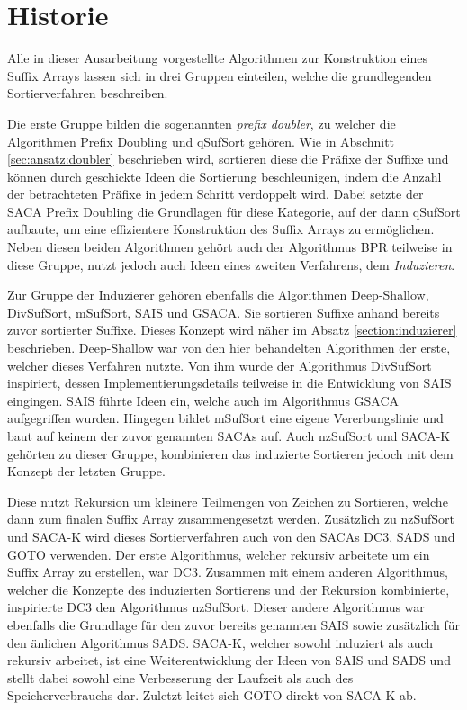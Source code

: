 \section{Historie}
Alle  in dieser Ausarbeitung vorgestellte Algorithmen zur Konstruktion eines Suffix Arrays lassen sich in drei Gruppen einteilen, welche die grundlegenden Sortierverfahren beschreiben. \par
Die erste Gruppe bilden die sogenannten \textit{prefix doubler}, zu welcher die Algorithmen Prefix Doubling und qSufSort geh{\"o}ren.
Wie in Abschnitt \ref{sec:ansatz:doubler} beschrieben wird, sortieren diese die Pr{\"a}fixe der Suffixe und k{\"o}nnen durch geschickte Ideen die Sortierung beschleunigen, indem die Anzahl der betrachteten Pr{\"a}fixe in jedem Schritt verdoppelt wird. 
Dabei setzte der SACA Prefix Doubling die Grundlagen f{\"u}r diese Kategorie, auf der dann qSufSort aufbaute, um eine effizientere Konstruktion des Suffix Arrays zu erm{\"o}glichen. 
Neben diesen beiden Algorithmen geh{\"o}rt auch der Algorithmus BPR teilweise in diese Gruppe, nutzt jedoch auch Ideen eines zweiten Verfahrens, dem \textit{Induzieren}. \par

Zur Gruppe der Induzierer geh{\"o}ren ebenfalls die Algorithmen Deep-Shallow, DivSufSort, mSufSort, SAIS und GSACA.
Sie sortieren Suffixe anhand bereits zuvor sortierter Suffixe.
Dieses Konzept wird n{\"a}her im Absatz \ref{section:induzierer} beschrieben.
Deep-Shallow war von den hier behandelten Algorithmen der erste, welcher dieses Verfahren nutzte.
Von ihm wurde der Algorithmus DivSufSort inspiriert, dessen Implementierungsdetails teilweise in die Entwicklung von SAIS eingingen.
SAIS f{\"u}hrte Ideen ein, welche auch im Algorithmus GSACA aufgegriffen wurden.
Hingegen bildet mSufSort eine eigene Vererbungslinie und baut auf keinem der zuvor genannten SACAs auf.
Auch nzSufSort und SACA-K geh{\"o}rten zu dieser Gruppe, kombinieren das induzierte Sortieren jedoch mit dem Konzept der letzten Gruppe. \par

Diese nutzt Rekursion um kleinere Teilmengen von Zeichen zu Sortieren, welche dann zum finalen Suffix Array zusammengesetzt werden.
Zus{\"a}tzlich zu nzSufSort und SACA-K wird dieses Sortierverfahren auch von den SACAs DC3, SADS und GOTO verwenden. 
Der erste Algorithmus, welcher rekursiv arbeitete um ein Suffix Array zu erstellen, war DC3. 
Zusammen mit einem anderen Algorithmus, welcher die Konzepte des induzierten Sortierens und der Rekursion kombinierte, inspirierte DC3 den Algorithmus nzSufSort. 
Dieser andere Algorithmus war ebenfalls die Grundlage f{\"u}r den zuvor bereits genannten SAIS sowie zusätzlich für den änlichen Algorithmus SADS.
SACA-K, welcher sowohl induziert als auch rekursiv arbeitet, ist eine Weiterentwicklung der Ideen von SAIS und SADS und stellt dabei sowohl eine Verbesserung der Laufzeit als auch des Speicherverbrauchs dar.
Zuletzt leitet sich GOTO direkt von SACA-K ab. \par

